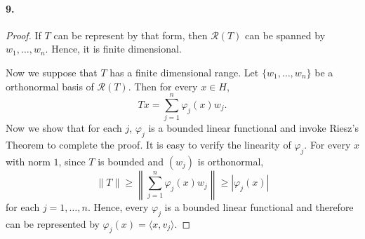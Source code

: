   \paragraph{9.}
  \begin{proof}
    If $T$ can be represent by that form, then $\mathcal{R}(T)$ can be spanned
    by $w_1,\dots,w_n$. Hence, it is finite dimensional.\par
    Now we suppose that $T$ has a finite dimensional range. Let $\{w_1,\dots,
    w_n\}$ be a orthonormal basis of $\mathcal{R}(T)$. Then for every $x\in H$,
    \[
      Tx=\sum_{j=1}^n\varphi_j(x)w_j.
    \]
    Now we show that for each $j$, $\varphi_j$ is a bounded linear functional
    and invoke Riesz's Theorem to complete the proof. It is easy to verify the
    linearity of $\varphi_j$. For every $x$ with norm $1$, since $T$ is bounded
    and $(w_j)$ is orthonormal,
    \[
      \|T\|\ge\left\|\sum_{j=1}^n\varphi_j(x)w_j\right\|\ge |\varphi_j(x)|
    \]
    for each $j=1,\dots,n$. Hence, every $\varphi_j$ is a bounded linear 
    functional and therefore can be represented by $\varphi_j(x)=\langle x,v_j
    \rangle$.
  \end{proof}
















